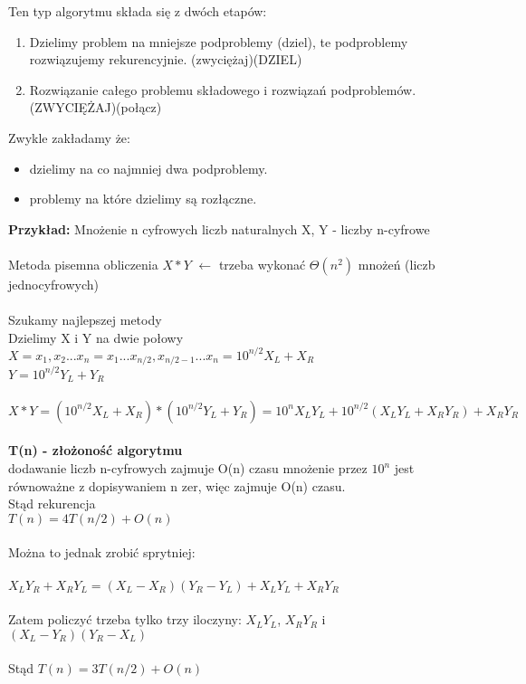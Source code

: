 Ten typ algorytmu składa się z dwóch etapów:
\begin{enumerate}
\item Dzielimy problem na mniejsze podproblemy (dziel), te podproblemy rozwiązujemy rekurencyjnie. (zwyciężaj)(DZIEL)
\item Rozwiązanie całego problemu składowego i rozwiązań podproblemów. (ZWYCIĘŻAJ)(połącz)
\end{enumerate}
Zwykle zakładamy że:
\begin{itemize}
\item dzielimy na co najmniej dwa podproblemy.
\item problemy na które dzielimy są rozłączne.
\end{itemize}
\textbf{Przykład: }Mnożenie n cyfrowych liczb naturalnych X, Y - liczby n-cyfrowe\\
\\
Metoda pisemna obliczenia $X*Y$ $\leftarrow$ trzeba wykonać $\Theta(n^2)$ mnożeń (liczb jednocyfrowych)\\
\\
Szukamy najlepszej metody\\
Dzielimy X i Y na dwie połowy\\
$X = x_1,x_2...x_n = x_1...x_{n/2},x_{n/2-1}...x_n = 10^{n/2}X_L+X_R$\\
$Y = 10^{n/2}Y_L+Y_R$\\
\\
$X*Y = (10^{n/2}X_L+X_R)*(10^{n/2}Y_L+Y_R) = 10^n X_L Y_L + 10^{n/2}(X_L Y_L + X_R Y_R) + X_R Y_R $\\
\\
\textbf{T(n) - złożoność algorytmu}\\
dodawanie liczb n-cyfrowych zajmuje O(n) czasu mnożenie przez $10^n$ jest równoważne z dopisywaniem n zer, więc zajmuje O(n) czasu. \\
Stąd rekurencja\\
$T(n) = 4T(n/2) + O(n)$\\
\\
Można to jednak zrobić sprytniej:\\
\\
$X_L Y_R + X_R Y_L = (X_L - X_R)(Y_R - Y_L) + X_L Y_L + X_R Y_R$\\
\\
Zatem policzyć trzeba tylko trzy iloczyny: $X_L Y_L$, $X_R Y_R$ i $(X_L - Y_R)(Y_R - X_L)$\\
\\
Stąd $T(n) = 3T(n/2) + O(n)$